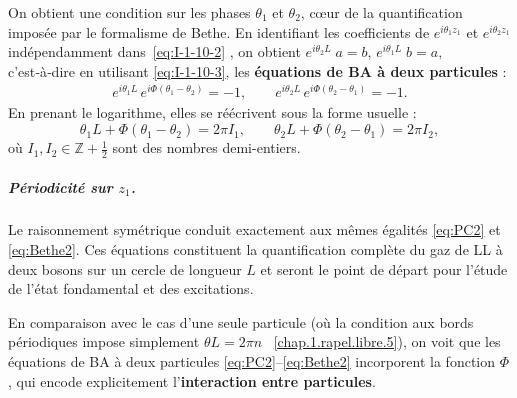 On obtient une condition sur les phases \( \theta_1 \) et \( \theta_2 \), cœur de la quantification imposée par le formalisme de Bethe.
En identifiant les coefficients de $e^{i\theta_{1}z_{1}}$ et
$e^{i\theta_{2}z_{1}}$ indépendamment dans~\eqref{eq:I-1-10-2} , on obtient
\(
	e^{i\theta_{2}L}\;a = b, 
	\,
	e^{i\theta_{1}L}\;b = a,
\)
c’est‑à‑dire en utilisant \eqref{eq:I-1-10-3}, les \textbf{équations de \gls{BA} à deux particules} :
\begin{eqnarray}\label{eq:PC2}
	e^{i\theta_{1}L}\,e^{i\Phi(\theta_{1}-\theta_{2})} = -1,
	\qquad
	e^{i\theta_{2}L}\,e^{i\Phi(\theta_{2}-\theta_{1})} = -1.	
\end{eqnarray}
En prenant le logarithme, elles se réécrivent sous la forme usuelle :
\begin{equation}\label{eq:Bethe2}
	\theta_{1}L + \Phi(\theta_{1}-\theta_{2}) = 2\pi I_{1}, 
	\qquad
	\theta_{2}L + \Phi(\theta_{2}-\theta_{1}) = 2\pi I_{2},
\end{equation}
où $I_{1},I_{2}\in\mathbb{Z} + \tfrac{1}{2}$ sont des nombres demi-entiers. 

\subparagraph{Périodicité sur $z_{1}$.}  Le raisonnement symétrique conduit exactement aux mêmes égalités \eqref{eq:PC2} et \eqref{eq:Bethe2}.  Ces équations  constituent la quantification complète du gaz de \acrlong{LL} à deux bosons sur un cercle de longueur $L$ et seront le point de départ pour l’étude de l’état fondamental et des excitations.

\medskip


En comparaison avec le cas d’une seule particule (où la condition aux bords périodiques impose simplement $\theta L = 2\pi n$ ~\eqref{chap.1.rapel.libre.5}), on voit que les équations de \gls{BA} à deux particules \eqref{eq:PC2}--\eqref{eq:Bethe2} incorporent la fonction $\Phi$, qui encode explicitement l’\textbf{interaction entre particules}.


